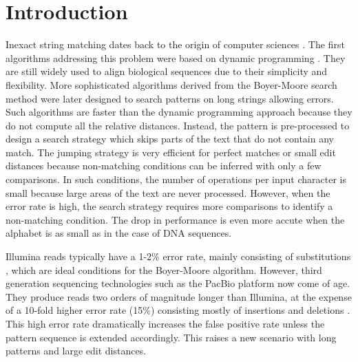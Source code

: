 \documentclass{bioinfo}
\begin{document}
\section{Introduction}

Inexact string matching dates back to the origin of computer sciences
\citep{Lev65}. The first algorithms addressing this problem were based
on dynamic programming \citep{NW70}. They are still widely used to
align biological sequences due to their simplicity and flexibility.
More sophisticated algorithms derived from the Boyer-Moore search
method \citep{BM77} were later designed to search patterns on long
strings allowing errors. Such algorithms are faster than the dynamic
programming approach because they do not compute all the relative
distances. Instead, the pattern is pre-processed to design a search
strategy which skips parts of the text that do not contain any
match. The jumping strategy is very efficient for perfect matches or
small edit distances because non-matching conditions can be inferred
with only a few comparisons. In such conditions, the number of
operations per input character is small because large areas of the
text are never processed. However, when the error rate is high, the
search strategy requires more comparisons to identify a non-matching
condition. The drop in performance is even more accute when the alphabet
is as small as in the case of DNA sequences.

Illumina reads typically have a 1-2\% error rate,
mainly consisting of substitutions \citep{Doh08}, which are ideal
conditions for the Boyer-Moore algorithm. However, third generation
sequencing technologies such as the PacBio platform now come of age.
They produce reads two orders of magnitude longer than Illumina, at
the expense of a 10-fold higher error rate (15\%) consisting mostly
of insertions and deletions \citep{Eid09}.  
This high error rate dramatically increases the false
positive rate unless the pattern sequence is extended
accordingly. This raises a new scenario with long patterns and
large edit distances.
\end{document}
